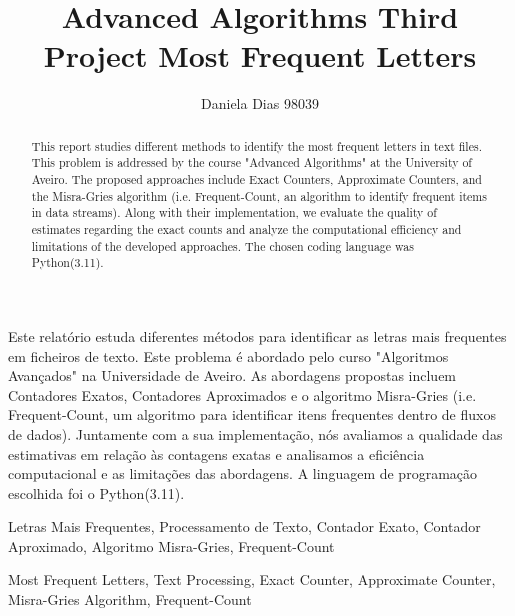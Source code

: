 \documentclass[]{revdetua}
\begin{document}

\title{Advanced Algorithms Third Project \linebreak Most Frequent Letters}
\author{Daniela Dias 98039}
\maketitle

\begin{abstract}
This report studies different methods to identify the most frequent letters in text files. This problem is addressed by the course "Advanced Algorithms" at the University of Aveiro. The proposed approaches include Exact Counters, Approximate Counters, and the Misra-Gries algorithm (i.e. Frequent-Count, an algorithm to identify frequent items in data streams). Along with their implementation, we evaluate the quality of estimates regarding the exact counts and analyze the computational efficiency and limitations of the developed approaches. The chosen coding language was Python(3.11).
\end{abstract}

\begin{resumo}
Este relatório estuda diferentes métodos para identificar as letras mais frequentes em ficheiros de texto. Este problema é abordado pelo curso "Algoritmos Avançados" na Universidade de Aveiro. As abordagens propostas incluem Contadores Exatos, Contadores Aproximados e o algoritmo Misra-Gries (i.e. Frequent-Count, um algoritmo para identificar itens frequentes dentro de fluxos de dados). Juntamente com a sua implementação, nós avaliamos a qualidade das estimativas em relação às contagens exatas e analisamos a eficiência computacional e as limitações das abordagens. A linguagem de programação escolhida foi o Python(3.11).

\end{resumo}

\begin{keywords}%
Letras Mais Frequentes, Processamento de Texto, Contador Exato, Contador Aproximado, Algoritmo  Misra-Gries, Frequent-Count
\end{keywords}

\begin{palavraschave}%
Most Frequent Letters, Text Processing, Exact Counter, Approximate Counter, Misra-Gries Algorithm, Frequent-Count
\end{palavraschave}
\end{document}
